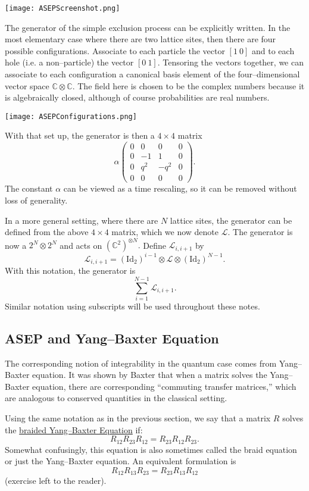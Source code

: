 \documentclass{ximera}
\begin{document}
\texttt{[image: ASEPScreenshot.png]}

The generator of the simple exclusion process can be explicitly written. In the most elementary case 
where there are two lattice sites, then there are four possible configurations. Associate to each
particle the vector $[1\ 0]$ and to each hole (i.e. a non--particle) the vector $[0 \ 1].$ Tensoring
the vectors together, we can associate to each configuration a canonical basis element of the four--dimensional
vector space $\mathbb{C}\otimes \mathbb{C}.$ The field here is chosen to be the complex numbers because
it is algebraically closed, although of course probabilities are real numbers. 

\texttt{[image: ASEPConfigurations.png]}

With that set up, the generator is then a $4\times 4$ matrix
$$
\alpha\left(
    \begin{array}{cccc}
       0 & 0 & 0 & 0 \\
       0 & -1 & 1 & 0 \\
       0 & q^2 & -q^2 & 0 \\
       0 & 0 & 0 & 0 
    \end{array}
\right).
$$
The constant $\alpha$ can be viewed as a time rescaling, so it can be removed without loss of generality. 

In a more general setting, where there are $N$ lattice sites, the generator can be defined from the
above \(4\times 4\) matrix, which we now denote \(\mathcal{L}.\) The generator is now a \(2^N \otimes 2^N\) and
acts on  \((\mathbb{C}^2)^{\otimes N}.\) Define \(\mathcal{L}_{i,i+1}\) by 
\[
\mathcal{L}_{i,i+1} = (\mathrm{Id}_2)^{i-1} \otimes \mathcal{L} \otimes (\mathrm{Id}_2)^{N-1}.
\]
With this notation, the generator is
\[
\sum_{i=1}^{N-1} \mathcal{L}_{i,i+1}.
\]
Similar notation using subscripts will be used throughout these notes.

\subsection{ASEP and Yang--Baxter Equation}
The corresponding notion of integrability in the quantum case comes from Yang--Baxter equation. 
It was shown by Baxter that when a matrix solves the Yang--Baxter equation, there are corresponding
``commuting transfer matrices,'' which are analogous to conserved quantities in the classical setting. 



Using the same notation as in the previous section, 
we say that a matrix \(R\) solves the \underline{braided Yang--Baxter Equation} if:
\[
R_{12}R_{23}R_{12} = R_{23}R_{12}R_{23}.
\]
Somewhat confusingly, this equation is also sometimes called the braid equation or just the Yang--Baxter equation.
An equivalent formulation is
\[
R_{12}R_{13}R_{23} = R_{23}R_{13}R_{12}
\]
(exercise left to the reader). 
\end{document}
